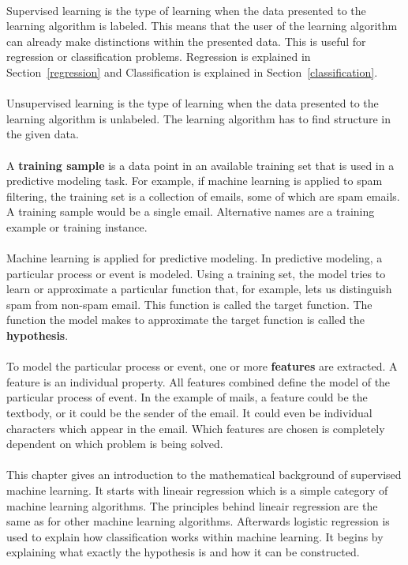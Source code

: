 \\
Supervised learning is the type of learning when the data presented to the learning algorithm is labeled. This means that the user of the learning algorithm can already make distinctions within the presented data. This is useful for regression or classification problems. Regression is explained in Section~\ref{regression} and Classification is explained in Section~\ref{classification}. \\
\\
Unsupervised learning is the type of learning when the data presented to the learning algorithm is unlabeled. The learning algorithm has to find structure in the given data. \\
\\ 
A \textbf{training sample} is a data point in an available training set that is used in a predictive modeling task. For example, if machine learning is applied to spam filtering, the training set is a collection of emails, some of which are spam emails. A training sample would be a single email. Alternative names are a training example or training instance. \\
\\
Machine learning is applied for predictive modeling. In predictive modeling, a particular process or event is modeled. Using a training set, the model tries to learn or approximate a particular function that, for example, lets us distinguish spam from non-spam email. This function is called the target function. The function the model makes to approximate the target function is called the \textbf{hypothesis}. \\
\\
To model the particular process or event, one or more \textbf{features} are extracted. A feature is an individual property. All features combined define the model of the particular process of event. In the example of mails, a feature could be the textbody, or it could be the sender of the email. It could even be individual characters which appear in the email. Which features are chosen is completely dependent on which problem is being solved. \\\\
This chapter gives an introduction to the mathematical background of supervised machine learning. It starts with lineair regression which is a simple category of machine learning algorithms. The principles behind lineair regression are the same as for other machine learning algorithms. Afterwards logistic regression is used to explain how classification works within machine learning. It begins by explaining what exactly the hypothesis is and how it can be constructed. 
